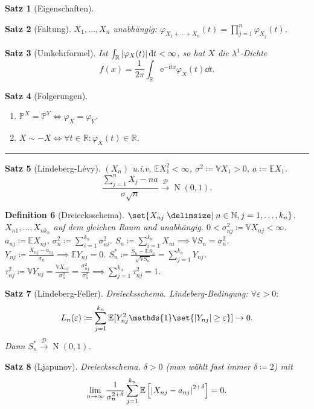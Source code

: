 \documentclass[a4paper,8pt]{article}
\newcounter{Sec}
\theoremstyle{nonumberbreak}
\newtheorem{definition}{Definition}[Sec]
\newtheorem{satz}[definition]{Satz}
\newcommand{\sep}{%
	\rule{\linewidth}{0.15pt}%
	\stepcounter{Sec}%
	}
\newcommand{\defas}{\coloneqq}
\DeclareMathOperator{\Nd}{N}
\newcommand{\ind}{\mathds{1}}
\renewcommand{\P}{\mathbb{P}}
\newcommand{\R}{\mathbb{R}}
\newcommand{\E}{\mathbb{E}}
\newcommand{\V}{\mathbb{V}}
\newcommand{\N}{\mathbb{N}}
\newcommand{\cf}{\varphi}
\newcommand{\e}{\mathrm{e}}
\renewcommand{\i}{\mathrm{i}}
\newcommand{\vk}{\mathrel{\stackrel{\mathcal{D}}{\longrightarrow}}}
\begin{document}
\begin{multicols*}{3}
\begin{satz}[Eigenschaften]
{\begin{multicols}{2}
\begin{enumerate}[label=(\alph*)]
		\end{enumerate}
		\end{multicols}}
	\end{satz}
	\begin{satz}[Faltung]
		$X_1,\ldots,X_n$ unabhängig: $\cf_{X_1+\cdots+X_n}(t)=\prod_{j=1}^n\cf_{X_j}(t)$.
	\end{satz}
	\begin{satz}[Umkehrformel]
		Ist $\int_\R\abs{\cf_X(t)}\dd{t}<\infty$, so hat $X$ die
		$\lambda^1$-Dichte \[f(x) = \frac{1}{2\pi}\int_\R\e^{-\i tx}\cf_X(t)\dd{t}.\]
	\end{satz}
	\begin{satz}[Folgerungen]
		\begin{enumerate}[label=(\alph*)]
			\item $\P^X=\P^Y\iff\cf_X=\cf_Y$.
			\item $X\sim -X\iff \forall t\in\R:\cf_X(t)\in\R$.
		\end{enumerate}
	\end{satz}
	\sep
	\begin{satz}[Lindeberg-Lévy]
		$(X_n)$ u.i.v, $\E X_1^2<\infty$, $\sigma^2\defas \V X_1>0$, $a\defas \E X_1$.
		\[
			\frac{\sum_{j=1}^nX_j - na}{\sigma\sqrt{n}}\vk \Nd(0, 1).
		\]
	\end{satz}
	\begin{definition}[Dreiecksschema] %
		$\set{X_{nj}\given n\in\N, j=1,\ldots,k_n}$. $X_{n1},\ldots,X_{nk_n}$ auf dem
		gleichen Raum und unabhängig. $0<\sigma_{nj}^2\defas \V X_{nj}<\infty$.
		$a_{nj}\defas \E X_{nj}$, $\sigma_n^2\defas\sum_{i=1}^{k_n}\sigma_{ni}^2$.
		$S_n\defas\sum_{i=1}^{k_n}X_{ni}\implies \V S_n=\sigma_n^2$.
		$Y_{nj}\defas\frac{X_{nj}-a_{nj}}{\sigma_n}\implies \E Y_{nj}=0$.
		$S_n^*\defas\frac{S_n-\E S_n}{\sqrt{\V S_n}} = \sum_{j=1}^{k_n} Y_{nj}$.
		$\tau_{nj}^2\defas \V Y_{nj} = \frac{\V X_{nj}}{\sigma_n^2}=\frac{\sigma_{nj}^2}{\sigma_n^2}
		\implies \sum_{j=1}^{k_n}\tau_{nj}^2=1$.
	\end{definition}
	\begin{satz}[Lindeberg-Feller]
		Dreiecksschema. Lindeberg-Bedingung: $\forall\varepsilon>0:$
		\[
			L_n(\varepsilon)\defas \sum_{j=1}^{k_n}\E[Y_{nj}^2\ind\set{\abs{Y_{nj}}\geq\varepsilon}]\to 0.
		\]
		Dann $S_n^*\vk\Nd(0, 1)$.
	\end{satz}
	\begin{satz}[Ljapunov]
		Dreiecksschema. $\delta>0$ (man wählt fast immer $\delta\defas 2$) mit
		\[
			\lim_{n\to\infty}\frac{1}{\sigma_n^{2+\delta}}\sum_{j=1}^{k_n}\E\left[\abs{X_{nj}-a_{nj}}^{2+\delta}\right]=0.
\]
\end{satz}
\end{multicols*}
\end{document}
